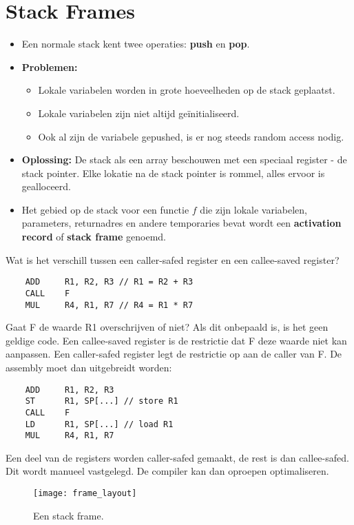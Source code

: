 \section{Stack Frames}
\begin{itemize}
	\item Een normale stack kent twee operaties: \textbf{push} en \textbf{pop}.
	\item \textbf{Problemen:}
	\begin{itemize}
		\item Lokale variabelen worden in grote hoeveelheden op de stack geplaatst. 
		\item Lokale variabelen zijn niet altijd geïnitialiseerd.
		\item Ook al zijn de variabele gepushed, is er nog steeds random access nodig.
	\end{itemize}  
	\item \textbf{Oplossing:} De stack als een array beschouwen met een speciaal register - de stack pointer. Elke lokatie na de stack pointer is rommel, alles ervoor is gealloceerd.
	\item Het gebied op de stack voor een functie $f$ die zijn lokale variabelen, parameters, returnadres en andere temporaries bevat wordt een \textbf{activation record} of \textbf{stack frame} genoemd.
\end{itemize}



Wat is het verschill tussen een caller-safed register en een callee-saved register?
\begin{lstlisting}
	ADD		R1, R2, R3 // R1 = R2 + R3
	CALL	F
	MUL		R4, R1, R7 // R4 = R1 * R7
	\end{lstlisting}
	Gaat F de waarde R1 overschrijven of niet? Als dit onbepaald is, is het geen geldige code. Een callee-saved register is de restrictie dat F deze waarde niet kan aanpassen. Een caller-safed register legt de restrictie op aan de caller van F. De assembly moet dan uitgebreidt worden:
	\begin{lstlisting}
	ADD		R1, R2, R3
	ST		R1, SP[...] // store R1 
	CALL	F
	LD      R1, SP[...] // load R1
	MUL		R4, R1, R7
	\end{lstlisting}
	Een deel van de registers worden caller-safed gemaakt, de rest is dan callee-safed. Dit wordt manueel vastgelegd. De compiler kan dan oproepen optimaliseren.






\begin{figure}
	\texttt{[image: frame\_layout]}
	\caption{Een stack frame.}
	\label{fig:stack_frame}
\end{figure}




